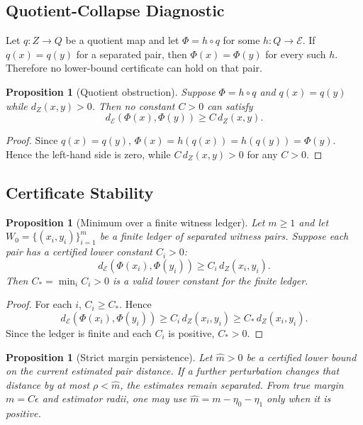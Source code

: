 \documentclass[11pt,a4paper]{article}
\theoremstyle{plain}
\newtheorem{proposition}[theorem]{Proposition}
\theoremstyle{definition}
\theoremstyle{remark}
\newcommand{\E}{\mathcal{E}}
\newcommand{\dE}{d_{\mathcal{E}}}
\begin{document}
\subsection{Quotient-Collapse Diagnostic}

Let $q:Z\to Q$ be a quotient map and let $\Phi=h\circ q$ for some $h:Q\to\E$. If $q(x)=q(y)$ for a separated pair, then $\Phi(x)=\Phi(y)$ for every such $h$. Therefore no lower-bound certificate can hold on that pair.

\begin{proposition}[Quotient obstruction]
Suppose $\Phi=h\circ q$ and $q(x)=q(y)$ while $d_Z(x,y)>0$. Then no constant $C>0$ can satisfy
\[
\dE(\Phi(x),\Phi(y))\geq C\,d_Z(x,y).
\]
\end{proposition}

\begin{proof}
Since $q(x)=q(y)$, $\Phi(x)=h(q(x))=h(q(y))=\Phi(y)$. Hence the left-hand side is zero, while $C\,d_Z(x,y)>0$ for any $C>0$.
\end{proof}

\subsection{Certificate Stability}

\begin{proposition}[Minimum over a finite witness ledger]
Let $m\geq1$ and let $W_0=\{(x_i,y_i)\}_{i=1}^m$ be a finite ledger of separated witness pairs. Suppose each pair has a certified lower constant $C_i>0$:
\[
\dE(\Phi(x_i),\Phi(y_i))\geq C_i\,d_Z(x_i,y_i).
\]
Then $C_*=\min_i C_i>0$ is a valid lower constant for the finite ledger.
\end{proposition}

\begin{proof}
For each $i$, $C_i\geq C_*$. Hence
\[
\dE(\Phi(x_i),\Phi(y_i))\geq C_i\,d_Z(x_i,y_i)\geq C_*\,d_Z(x_i,y_i).
\]
Since the ledger is finite and each $C_i$ is positive, $C_*>0$.
\end{proof}

\begin{proposition}[Strict margin persistence]
Let $\widehat m>0$ be a certified lower bound on the current estimated pair distance. If a further perturbation changes that distance by at most $\rho<\widehat m$, the estimates remain separated. From true margin $m=C\epsilon$ and estimator radii, one may use $\widehat m=m-\eta_0-\eta_1$ only when it is positive.
\end{proposition}
\end{document}
